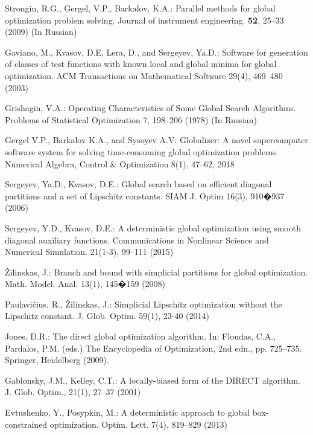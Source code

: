 \documentclass[runningheads]{llncs}
\begin{document}
\begin{thebibliography}{107}
Strongin, R.G., Gergel, V.P., Barkalov, K.A.: Parallel methods for global optimization problem
solving. Journal of instrument engineering. \textbf{52}, 25--33 (2009) (In Russian)

Gaviano, M., Kvasov, D.E, Lera, D., and Sergeyev, Ya.D.: Software for generation of classes
of test functions with known local and global minima for global optimization. ACM
Transactions on Mathematical Software 29(4), 469--480 (2003)

Grishagin, V.A.: Operating Characteristics of Some Global Search Algorithms. Problems of
Statistical Optimization 7, 198--206 (1978) (In Russian)

Gergel V.P., Barkalov K.A., and Sysoyev A.V: Globalizer: A novel supercomputer software
system for solving time-consuming global optimization problems. Numerical Algebra, Control
\& Optimization 8(1), 47--62, 2018

Sergeyev, Ya.D., Kvasov, D.E.: Global search based on efficient diagonal partitions and a set
of Lipschitz constants. SIAM J. Optim 16(3), 910�937 (2006)

Sergeyev, Y.D., Kvasov, D.E.: A deterministic global optimization using smooth diagonal
auxiliary functions. Communications in Nonlinear Science and Numerical Simulation. 21(1-3),
99--111 (2015)

\v Zilinskas, J.: Branch and bound with simplicial partitions for global optimization. Math.
Model. Anal.
13(1), 145�159 (2008)

Paulavi\v cius, R., \v Zilinskas, J.: Simplicial Lipschitz optimization without the Lipschitz
constant. J. Glob. Optim. 59(1), 23-40 (2014)

Jones, D.R.: The direct global optimization algorithm. In: Floudas, C.A., Pardalos, P.M.
(eds.) The Encyclopedia of Optimization, 2nd edn., pp. 725--735. Springer, Heidelberg
(2009).

Gablonsky, J.M., Kelley, C.T.: A locally-biased form of the DIRECT algorithm. J. Glob.
Optim., 21(1), 27--37 (2001)

Evtushenko, Y., Posypkin, M.: A deterministic approach to global box-constrained
optimization. Optim. Lett. 7(4), 819--829 (2013)



\end{thebibliography}
\end{document}
